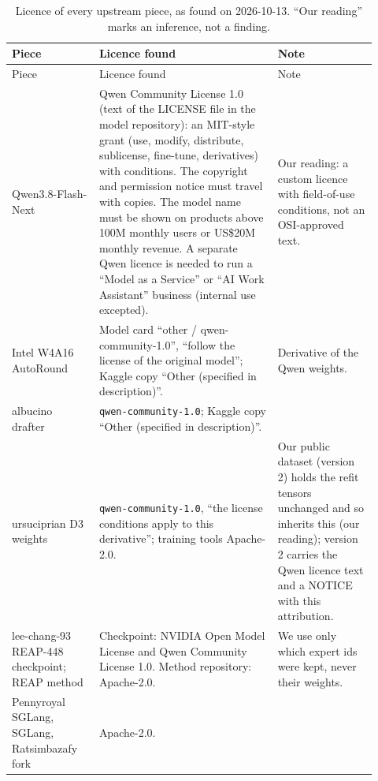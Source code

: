 \begingroup\footnotesize
\setlength{\tabcolsep}{3pt}
\renewcommand{\arraystretch}{1.1}
\begin{longtable}{@{}>{\raggedright\arraybackslash}p{0.22\linewidth}>{\raggedright\arraybackslash}p{0.45\linewidth}>{\raggedright\arraybackslash}p{0.25\linewidth}@{}}
\caption{Licence of every upstream piece, as found on 2026-10-13. ``Our reading'' marks an inference, not a finding.}\label{tab:licences}\\
\toprule
Piece & Licence found & Note \\
\midrule
\endfirsthead
\toprule
Piece & Licence found & Note \\
\midrule
\endhead
\bottomrule
\endfoot
Qwen3.8-Flash-Next \citep{qwen38flashnext}
& Qwen Community License 1.0 (text of the LICENSE file in the model repository): an MIT-style grant (use, modify, distribute, sublicense, fine-tune, derivatives) with conditions. The copyright and permission notice must travel with copies. The model name must be shown on products above 100M monthly users or US\$20M monthly revenue. A separate Qwen licence is needed to run a ``Model as a Service'' or ``AI Work Assistant'' business (internal use excepted). %
& Our reading: a custom licence with field-of-use conditions, not an OSI-approved text. \\
\addlinespace
Intel W4A16 AutoRound \citep{intel2026w4a16}
& Model card ``other / qwen-community-1.0'', ``follow the license of the original model''; Kaggle copy ``Other (specified in description)''.
& Derivative of the Qwen weights. \\
\addlinespace
albucino drafter \citep{albucino2026drafter}
& \texttt{qwen-community-1.0}; Kaggle copy ``Other (specified in description)''.
& \\
\addlinespace
ursuciprian D3 weights \citep{ursuciprian2026d3}
& \texttt{qwen-community-1.0}, ``the license conditions apply to this derivative''; training tools Apache-2.0.
& Our public dataset (version 2) holds the refit tensors unchanged and so inherits this (our reading); version 2 carries the Qwen licence text and a NOTICE with this attribution. \\ %
\addlinespace
lee-chang-93 REAP-448 checkpoint; REAP method \citep{lasby2025reap}
& Checkpoint: NVIDIA Open Model License and Qwen Community License 1.0. Method repository: Apache-2.0.
& We use only which expert ids were kept, never their weights. \\
\addlinespace
Pennyroyal SGLang, SGLang, Ratsimbazafy fork
& Apache-2.0.
& \\

\end{longtable}
